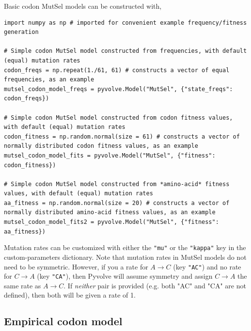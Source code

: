 \documentclass{article}
\newcommand{\code}[1]{\texttt{\small{#1}}}
\begin{document}
Basic codon MutSel models can be constructed with,
\begin{lstlisting}
import numpy as np # imported for convenient example frequency/fitness generation

# Simple codon MutSel model constructed from frequencies, with default (equal) mutation rates
codon_freqs = np.repeat(1./61, 61) # constructs a vector of equal frequencies, as an example
mutsel_codon_model_freqs = pyvolve.Model("MutSel", {"state_freqs": codon_freqs})

# Simple codon MutSel model constructed from codon fitness values, with default (equal) mutation rates
codon_fitness = np.random.normal(size = 61) # constructs a vector of normally distributed codon fitness values, as an example
mutsel_codon_model_fits = pyvolve.Model("MutSel", {"fitness": codon_fitness})

# Simple codon MutSel model constructed from *amino-acid* fitness values, with default (equal) mutation rates
aa_fitness = np.random.normal(size = 20) # constructs a vector of normally distributed amino-acid fitness values, as an example
mutsel_codon_model_fits2 = pyvolve.Model("MutSel", {"fitness": aa_fitness})
\end{lstlisting}

Mutation rates can be customized with either the \code{"mu"} or the \code{"kappa"} key in the custom-parameters dictionary. Note that mutation rates in MutSel models do not need to be symmetric. However, if you a rate for $A \rightarrow C$ (key \code{"AC"}) and no rate for $C \rightarrow A$ (key \code{"CA"}), then Pyvolve will assume symmetry and assign $C \rightarrow A$ the same rate as $A \rightarrow C$. If \emph{neither} pair is provided (e.g. both "AC" and "CA" are not defined), then both will be given a rate of 1.



\subsection{Empirical codon model}\label{sec:ecm}
\end{document}
